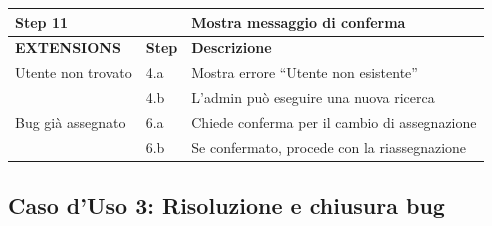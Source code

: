 \begin{longtable}{|p{3cm}|p{7cm}|p{5.5cm}|}
\hline
Step 11 & & Mostra messaggio di conferma \\
\hline\hline
\textbf{EXTENSIONS} & \textbf{Step} & \textbf{Descrizione} \\
\hline
Utente non trovato & 4.a & Mostra errore ``Utente non esistente'' \\
\hline
 & 4.b & L'admin può eseguire una nuova ricerca \\
\hline
Bug già assegnato & 6.a & Chiede conferma per il cambio di assegnazione \\
\hline
 & 6.b & Se confermato, procede con la riassegnazione \\
\hline
\end{longtable}

\subsection{Caso d'Uso 3: Risoluzione e chiusura bug}

